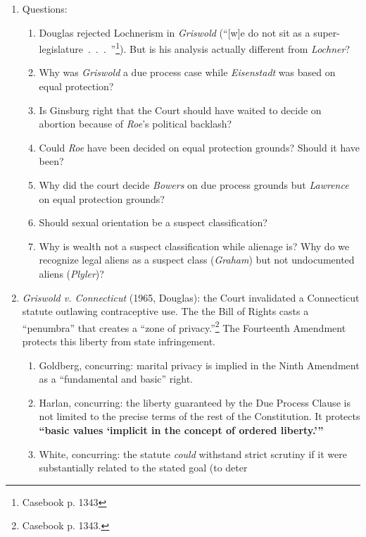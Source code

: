 \begin{enumerate}
    \item Questions:
    \begin{enumerate}
        \item Douglas rejected Lochnerism in \emph{Griswold} (``[w]e do not 
        sit as a super-legislature~.~.~.~''\footnote{Casebook p. 1343}). But 
        is his analysis actually different from \emph{Lochner}?
        \item Why was \emph{Griswold} a due process case while 
        \emph{Eisenstadt} was based on equal protection?
        \item Is Ginsburg right that the Court should have waited to decide on 
        abortion because of \emph{Roe}'s political backlash?
        \item Could \emph{Roe} have been decided on equal protection grounds? 
        Should it have been?
        \item Why did the court decide \emph{Bowers} on due process 
        grounds but \emph{Lawrence} on equal protection grounds?
        \item Should sexual orientation be a suspect classification?
        \item Why is wealth not a suspect classification while alienage is? 
        Why do we recognize legal aliens as a suspect class (\emph{Graham}) 
        but not undocumented aliens (\emph{Plyler})?
    \end{enumerate}
    \item \emph{Griswold v. Connecticut} (1965, Douglas): the Court 
    invalidated a Connecticut statute outlawing contraceptive use. The 
    the Bill of Rights casts a ``penumbra'' that creates a ``zone of 
    privacy.''\footnote{Casebook p. 1343.} The Fourteenth Amendment protects 
    this liberty from state infringement.
    \begin{enumerate}
        \item Goldberg, concurring: marital privacy is implied in the Ninth 
        Amendment as a ``fundamental and basic'' right.
        \item Harlan, concurring: the liberty guaranteed by the Due Process 
        Clause is not limited to the precise terms of the rest of the 
        Constitution.  It protects \textbf{\enquote{basic values 
        \enquote{implicit in the concept of ordered liberty.}}}
        \item White, concurring: the statute \emph{could} withstand strict 
        scrutiny if it were substantially related to the stated goal (to deter 

\end{enumerate}
\end{enumerate}
